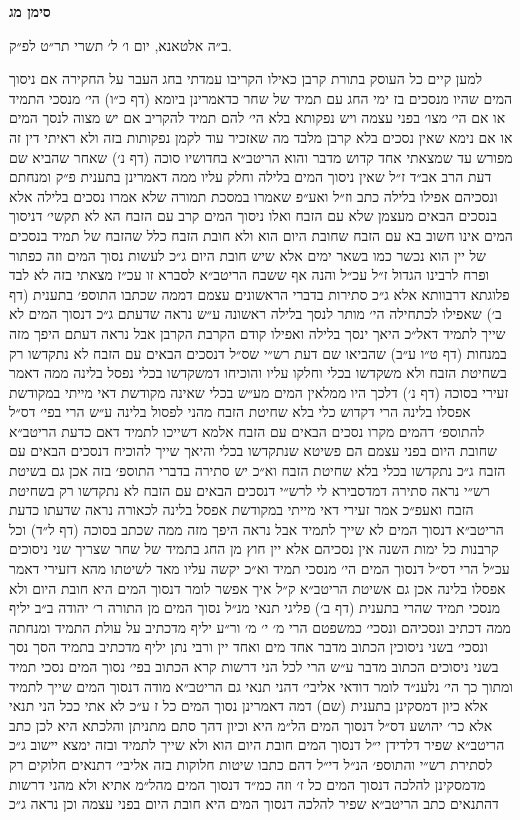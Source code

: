 \documentclass[12pt, openany]{book}
\newcommand{\chapname}{}
\newcommand{\newchap}[1]{
	\addcontentsline{toc}{chapter}{#1}
	\renewcommand{\chapname}{#1}
		\begin{center}
			\textbf{%
\fontsize{16pt}{16pt}\selectfont
				#1}
		\end{center}
}
\begin{document}
\newchap{סימן מג}
\begin{multicols}{2}
ב״ה אלטאנא, יום ו׳ ל׳ תשרי תר״ט לפ״ק.\\\vspace{0pt}

למען קיים כל העוסק בתורת קרבן כאילו הקריבו עמדתי בחג העבר על החקירה אם ניסוך המים שהיו מנסכים בז ימי החג עם תמיד של שחר כדאמרינן ביומא (דף כ״ו) הי׳ מנסכי התמיד או אם הי׳ מצו׳ בפני עצמה ויש נפקותא בלא הי׳ להם תמיד להקריב אם יש מצוה לנסך המים או אם נימא שאין נסכים בלא קרבן מלבד מה שאזכיר עוד לקמן נפקותות בזה ולא ראיתי דין זה מפורש עד שמצאתי אחד קדוש מדבר והוא הריטב״א בחדושיו סוכה (דף נ׳) שאחר שהביא שם דעת הרב אב״ד ז״ל שאין ניסוך המים בלילה וחלק עליו ממה דאמרינן בתענית פ״ק ומנחתם ונסכיהם אפילו בלילה כתב וז״ל ואע״פ שאמרו במסכת תמורה שלא אמרו נסכים בלילה אלא בנסכים הבאים מעצמן שלא עם הזבח ואלו ניסוך המים קרב עם הזבח הא לא תקשי׳ דניסוך המים אינו חשוב בא עם הזבח שחובת היום הוא ולא חובת הזבח כלל שהזבח של תמיד בנסכים של יין הוא נכשר כמו בשאר ימים אלא שיש חובת היום ג״כ לעשות נסוך המים וזה כפתור ופרח לרבינו הגדול ז״ל עכ״ל והנה אף ששבח הריטב״א לסברא זו עכ״ז מצאתי בזה לא לבד פלוגתא דרבוותא אלא ג״כ סתירות בדברי הראשונים עצמם דממה שכתבו התוספ׳ בתענית (דף ב׳) שאפילו לכתחילה הי׳ מותר לנסך בלילה ראשונה ע״ש נראה שדעתם ג״כ דנסוך המים לא שייך לתמיד דאל״כ היאך ינסך בלילה ואפילו קודם הקרבת הקרבן אבל נראה דעתם היפך מזה במנחות (דף ט״ו ע״ב) שהביאו שם דעת רש״י שס״ל דנסכים הבאים עם הזבח לא נתקדשו רק בשחיטת הזבח ולא משקדשו בכלי וחלקו עליו והוכיחו דמשקדשו בכלי נפסל בלינה ממה דאמר זעירי בסוכה (דף נ׳) דלכך היו ממלאין המים מע״ש בכלי שאינה מקודשת דאי מייתי במקודשת אפסלו בלינה הרי דקדוש כלי בלא שחיטת הזבח מהני לפסול בלינה ע״ש הרי בפי׳ דס״ל להתוספ׳ דהמים מקרו נסכים הבאים עם הזבח אלמא דשייכו לתמיד דאם כדעת הריטב״א שחובת היום בפני עצמם הם פשיטא שנתקדשו בכלי והיאך שייך להוכיח דנסכים הבאים עם הזבח ג״כ נתקדשו בכלי בלא שחיטת הזבח וא״כ יש סתירה בדברי התוספ׳ בזה אכן גם בשיטת רש״י נראה סתירה דמדסבירא לי לרש״י דנסכים הבאים עם הזבח לא נתקדשו רק בשחיטת הזבח ואעפ״כ אמר זעירי דאי מייתי במקודשת אפסל בלינה לכאורה נראה שדעתו כדעת הריטב״א דנסוך המים לא שייך לתמיד אבל נראה היפך מזה ממה שכתב בסוכה (דף ל״ד) וכל קרבנות כל ימות השנה אין נסכיהם אלא יין חוץ מן החג בתמיד של שחר שצריך שני ניסוכים עכ״ל הרי דס״ל דנסוך המים הי׳ מנסכי תמיד וא״כ יקשה עליו מאד לשיטתו מהא דזעירי דאמר אפסלו בלינה אכן גם אשיטת הריטב״א ק״ל איך אפשר לומר דנסוך המים היא חובת היום ולא מנסכי תמיד שהרי בתענית (דף ב׳) פליגי תנאי מנ״ל נסוך המים מן התורה ר׳ יהודה ב״ב יליף ממה דכתיב ונסכיהם ונסכי׳ כמשפטם הרי מ׳ י׳ מ׳ ור״ע יליף מדכתיב על עולת התמיד ומנחתה ונסכי׳ בשני ניסוכין הכתוב מדבר אחד מים ואחד יין ורבי נתן יליף מדכתיב בתמיד הסך נסך בשני ניסוכים הכתוב מדבר ע״ש הרי לכל הני דרשות קרא הכתוב בפי׳ נסוך המים נסכי תמיד ומתוך כך הי׳ נלענ״ד לומר דודאי אליבי׳ דהני תנאי גם הריטב״א מודה דנסוך המים שייך לתמיד אלא כיון דמסקינן בתענית (שם) דמה דאמרינן נסוך המים כל ז ע״כ לא אתי ככל הני תנאי אלא כר׳ יהושע דס״ל דנסוך המים הל״מ היא וכיון דהך סתם מתניתן והלכתא היא לכן כתב הריטב״א שפיר דלדידן י״ל דנסוך המים חובת היום הוא ולא שייך לתמיד ובזה ימצא יישוב ג״כ לסתירת רש״י והתוספ׳ הנ״ל די״ל דהם כתבו שיטות חלוקות בזה אליבי׳ דתנאים חלוקים רק מדמסקינן להלכה דנסוך המים כל ז׳ וזה כמ״ד דנסוך המים מהל״מ אתיא ולא מהני דרשות דהתנאים כתב הריטב״א שפיר להלכה דנסוך המים היא חובת היום בפני עצמה וכן נראה ג״כ 
\end{multicols}
\end{document}
